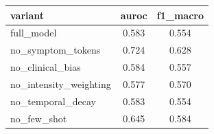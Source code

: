 \begin{tabular*}{\linewidth}{@{\extracolsep{\fill}}lcc@{}}
\toprule
variant & auroc & f1\_macro \\
\midrule
full\_model & 0.583 & 0.554 \\
no\_symptom\_tokens & 0.724 & 0.628 \\
no\_clinical\_bias & 0.584 & 0.557 \\
no\_intensity\_weighting & 0.577 & 0.570 \\
no\_temporal\_decay & 0.583 & 0.554 \\
no\_few\_shot & 0.645 & 0.584 \\
\bottomrule
\end{tabular*}
